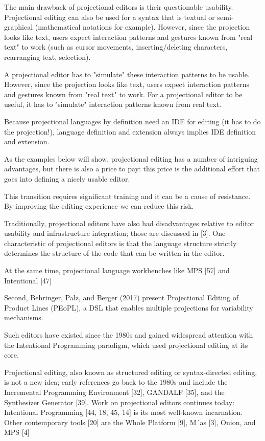 The main drawback of projectional editors is their questionable usability.
Projectional editing can also be used for a syntax that is textual or semi-graphical (mathematical notations for example).
However, since the projection looks like text, users expect interaction patterns and gestures known from "real text" to work (such as cursor movements, inserting/deleting characters, rearranging text, selection).

A projectional editor has to "simulate" these interaction patterns to be usable. 
However, since the projection looks like text, users expect interaction patterns and gestures known from "real text" to work.
For a projectional editor to be useful, it has to "simulate" interaction patterns known from real text.


Because projectional languages by definition need an IDE for editing (it has to do the projection!), language definition and extension always implies IDE definition and extension.


As the examples below will show, projectional editing has a number of intriguing advantages, but there is also a price to pay: this price is the additional effort that goes into defining a nicely usable editor.

This transition requires significant training and it can be a cause of resistance.
By improving the editing experience we can reduce this risk.



Traditionally, projectional editors have also had disadvantages relative to editor usability and infrastructure integration; those are discussed in [3].
One characteristic of projectional editors is that the language structure strictly determines the structure of the code that can be written in the editor.


At the same time, projectional language workbenches like MPS [57] and Intentional [47]

Second, Behringer, Palz, and Berger (2017) present Projectional Editing of Product Lines (PEoPL), a DSL that enables multiple projections for variability mechanisms.

Such editors have existed since the 1980s and gained widespread attention with the Intentional Programming paradigm, which used projectional editing at its core.

Projectional editing, also known as structured editing or syntax-directed editing, is not a new idea; early references go back to the 1980s and include the Incremental Programming Environment [32], GANDALF [35], and the Synthesizer Generator [39].
Work on projectional editors continues today: Intentional Programming [44, 18, 45, 14] is its most well-known incarnation.
Other contemporary tools [20] are the Whole Platform [9], M´as [3], Onion, and MPS [4]

